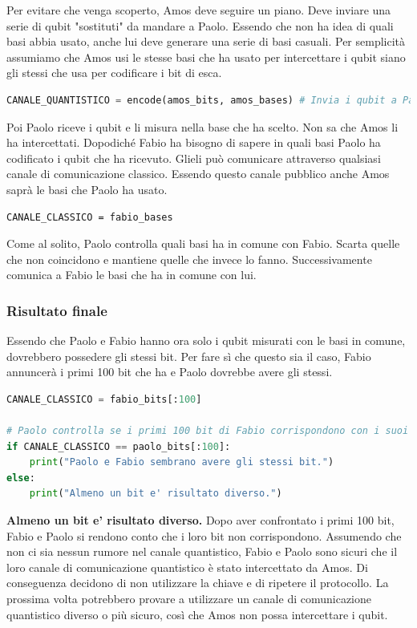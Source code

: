 \documentclass[a4paper]{article}
\begin{document}
Per evitare che venga scoperto, Amos deve seguire un piano. Deve inviare una serie di qubit
"sostituti" da mandare a Paolo. Essendo che non ha idea di quali basi abbia usato,
anche lui deve generare una serie di basi casuali. Per semplicità 
assumiamo che Amos usi le stesse basi che ha usato per intercettare i qubit siano gli stessi
che usa per codificare i bit di esca.
\begin{lstlisting}[language=Python]
CANALE_QUANTISTICO = encode(amos_bits, amos_bases) # Invia i qubit a Paolo
\end{lstlisting}
Poi Paolo riceve i qubit e li misura nella base che ha scelto. Non sa che Amos li ha intercettati.
Dopodiché Fabio ha bisogno di sapere in quali basi Paolo ha codificato i qubit che ha ricevuto. 
Glieli può comunicare attraverso qualsiasi canale di comunicazione classico. Essendo questo canale pubblico
anche Amos saprà le basi che Paolo ha usato.
\begin{lstlisting}
CANALE_CLASSICO = fabio_bases
\end{lstlisting}
Come al solito, Paolo controlla quali basi ha in comune con Fabio. Scarta quelle che non coincidono e mantiene quelle che invece lo fanno.
Successivamente comunica a Fabio le basi che ha in comune con lui.

\subsubsection*{Risultato finale}

Essendo che Paolo e Fabio hanno ora solo i qubit misurati con le basi in comune, dovrebbero possedere gli stessi bit.
Per fare sì che questo sia il caso, Fabio annuncerà i primi 100 bit che ha e Paolo dovrebbe avere gli stessi.
\begin{lstlisting}[language=Python]
CANALE_CLASSICO = fabio_bits[:100] 

# Paolo controlla se i primi 100 bit di Fabio corrispondono con i suoi primi 100 bit
if CANALE_CLASSICO == paolo_bits[:100]:
    print("Paolo e Fabio sembrano avere gli stessi bit.")
else:
    print("Almeno un bit e' risultato diverso.")
\end{lstlisting}
\textbf{Almeno un bit e' risultato diverso.} Dopo aver confrontato i primi 100 bit, Fabio e Paolo
si rendono conto che i loro bit non corrispondono. Assumendo che non ci sia nessun rumore nel canale quantistico,
Fabio e Paolo sono sicuri che il loro canale di comunicazione quantistico è stato intercettato da Amos.
Di conseguenza decidono di non utilizzare la chiave e di ripetere il protocollo. La prossima volta
potrebbero provare a utilizzare un canale di comunicazione quantistico diverso o più sicuro, così che
Amos non possa intercettare i qubit.


 
\end{document}
